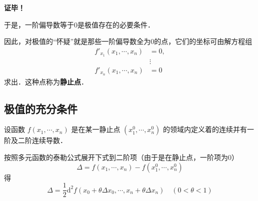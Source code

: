 \textbf{证毕！}

于是，一阶偏导数等于0是极值存在的必要条件．

因此，对极值的“怀疑”就是那些一阶偏导数全为0的点，它们的坐标可由解方程组
\begin{equation}
\begin{aligned}
f'_{x_1}(x_1,\cdots,x_n)&=0,\\
&\vdots\\
f'_{x_n}(x_1,\cdots,x_n)&=0
\end{aligned}
\end{equation}
求出．这种点称为\textbf{静止点}．
\subsection{极值的充分条件}
设函数 $f(x_1,\cdots,x_n)$ 是在某一静止点 $(x_1^0,\cdots,x_n^0)$ 的领域内定义着的连续并有一阶及二阶连续导数．
\begin{issues}
\end{issues}
按照多元函数的泰勒公式展开下式到二阶项（由于是在静止点，一阶项为0）
\begin{equation}
\Delta=f(x_1,\cdots,x_n)-f(x_1^0,\cdots,x_n^0)
\end{equation}
得
\begin{equation}
\Delta=\frac{1}{2}\mathrm{d}^2 f(x_0+\theta\Delta x_0,\cdots,x_n+\theta\Delta x_n)\quad (0<\theta<1)
\end{equation}
